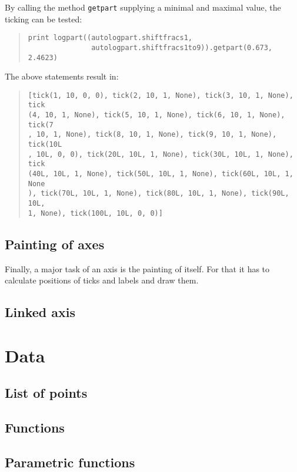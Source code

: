 By calling the method \verb|getpart| supplying a minimal and maximal
value, the ticking can be tested:
\begin{quote}
\begin{verbatim}
print logpart((autologpart.shiftfracs1,
               autologpart.shiftfracs1to9)).getpart(0.673, 2.4623)
\end{verbatim}
\end{quote}
The above statements result in:
\begin{quote}
\begin{verbatim}
[tick(1, 10, 0, 0), tick(2, 10, 1, None), tick(3, 10, 1, None), tick
(4, 10, 1, None), tick(5, 10, 1, None), tick(6, 10, 1, None), tick(7
, 10, 1, None), tick(8, 10, 1, None), tick(9, 10, 1, None), tick(10L
, 10L, 0, 0), tick(20L, 10L, 1, None), tick(30L, 10L, 1, None), tick
(40L, 10L, 1, None), tick(50L, 10L, 1, None), tick(60L, 10L, 1, None
), tick(70L, 10L, 1, None), tick(80L, 10L, 1, None), tick(90L, 10L, 
1, None), tick(100L, 10L, 0, 0)]
\end{verbatim}
\end{quote}

\subsection{Painting of axes}

Finally, a major task of an axis is the painting of itself. For that
it has to calculate positions of ticks and labels and draw them.

\subsection{Linked axis}

\section{Data}

\subsection{List of points}

\subsection{Functions}

\subsection{Parametric functions}

